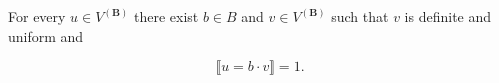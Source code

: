For every $u \in V^{(\mathbf{B})}$ there exist $b \in B$ and $v \in V^{(\mathbf{B})}$ such that $v$ is definite and uniform and

$$\llbracket u = b \cdot v \rrbracket = 1.$$

